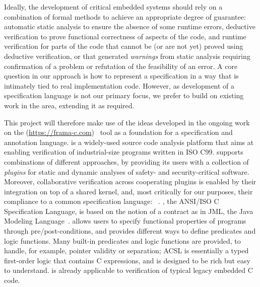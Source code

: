 Ideally, the development of critical embedded systems should rely on a combination of formal methods to achieve an appropriate degree of guarantee:
automatic static analysis to ensure the absence of some runtime errors,
deductive verification to prove functional correctness of aspects of the code,
and runtime verification for parts of the code that cannot be (or are not yet) proved using deductive verification,
or that generated \emph{warnings} from static analysis requiring confirmation of a problem or refutation of the feasibility of an error.  A core question in our approach is how to represent a specification in a way that is intimately tied to real implementation code.  However, as development of a specification language is not our primary focus, we prefer to build on existing work in the area, extending it as required.

This project will therefore make use of the ideas developed in the ongoing work on the \framac{} (\url{https://frama-c.com})~\cite{KKP2015:FAC} tool as a foundation for a specification and annotation language.
\framac is a widely-used source code analysis platform that aims at enabling verification of industrial-size programs written in ISO C99.
\framac{} supports combinations of different approaches, by providing its users with a collection of \emph{plugins} for static and dynamic analyses of safety- and security-critical software.
Moreover, collaborative verification across cooperating plugins is enabled by their integration on top of a shared kernel, and, most critically for our purposes, their compliance to a common specification language: \acsl~\cite{ACSL}.
\acsl, the ANSI/ISO C Specification Language, is based on the notion of a contract as in JML, the Java Modeling Language~\cite{jml}.
\acsl allows users to specify functional properties of programs through pre/post-conditions, and provides different ways to define predicates and logic functions.
Many built-in predicates and logic functions are provided, to handle, for example, pointer validity or separation; ACSL is essentially a typed first-order logic that contains C expressions, and is designed to be rich but easy to understand.
\framac is already applicable to verification of typical legacy embedded C code.

